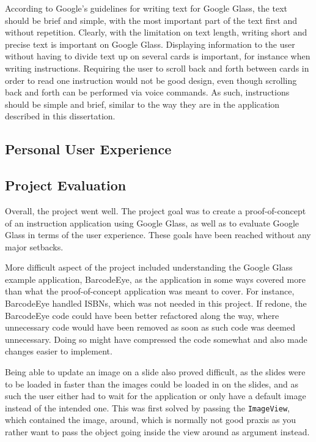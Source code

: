 According to Google's guidelines for writing text for Google Glass, the text should be brief and simple, with the most important part of the text first and without repetition. Clearly, with the limitation on text length, writing short and precise text is important on Google Glass. Displaying information to the user without having to divide text up on several cards is important, for instance when writing instructions. Requiring the user to scroll back and forth between cards in order to read one instruction would not be good design, even though scrolling back and forth can be performed via voice commands. As such, instructions should be simple and brief, similar to the way they are in the application described in this dissertation.

\subsection{Personal User Experience}
\label{subsec:personalexperience}


\subsection{Project Evaluation}
Overall, the project went well. The project goal was to create a proof-of-concept of an instruction application using Google Glass, as well as to evaluate Google Glass in terms of the user experience. These goals have been reached  without any major setbacks. 

More difficult aspect of the project included understanding the Google Glass example application, BarcodeEye, as the application in some ways covered more than what the proof-of-concept application was meant to cover. For instance, BarcodeEye handled ISBNs, which was not needed in this project. If redone, the BarcodeEye code could have been better refactored along the way, where unnecessary code would have been removed as soon as such code was deemed unnecessary. Doing so might have compressed the code somewhat and also made changes easier to implement. 

Being able to update an image on a slide also proved difficult, as the slides were to be loaded in faster than the images could be loaded in on the slides, and as such the user either had to wait for the application or only have a default image instead of the intended one. This was first solved by passing the \texttt{ImageView}, which contained the image, around, which is normally not good praxis as you rather want to pass the object going inside the view around as argument instead.

